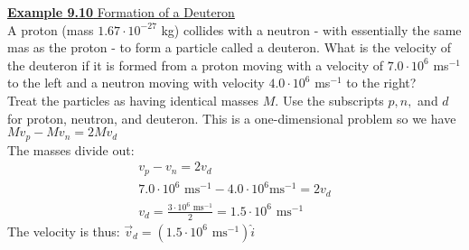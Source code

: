 \documentclass[a4paper]{article}
\let\bf\textbf
\begin{document}
\begin{shaded}
    \underline{\bf{Example 9.10} Formation of a Deuteron}
    \vspace{2mm}\\
    A proton (mass $1.67 \cdot 10^{-27}$ kg) collides with a neutron - with essentially the same mas as the proton - to form a particle called a deuteron. What is the velocity of the deuteron if it is formed from a proton moving with a velocity of $7.0 \cdot 10^6$ ms$^{-1}$ to the left and a neutron moving with velocity $4.0 \cdot 10^6$ ms$^{-1}$ to the right?
    \vspace{1mm}\\
    Treat the particles as having identical masses $M$. Use the subscripts $p, n,$ and $d$ for proton, neutron, and deuteron. This is a one-dimensional problem so we have\\
    $Mv_p - Mv_n = 2Mv_d$\\
    The masses divide out:
    \begin{align*}
        v_p - v_n = 2v_d\\
        7.0 \cdot 10^6 \text{ ms}^{-1} - 4.0 \cdot 10^6 \text{ms}^{-1} = 2v_d\\
        v_d = \frac{3 \cdot 10^6 \text{ ms}^{-1}}{2} = 1.5 \cdot 10^6 \text{ ms}^{-1}
    \end{align*}
    The velocity is thus: $\vec{v}_d = (1.5 \cdot 10^6\text{ ms}^{-1})\hat{i}$
\end{shaded}
\end{document}
